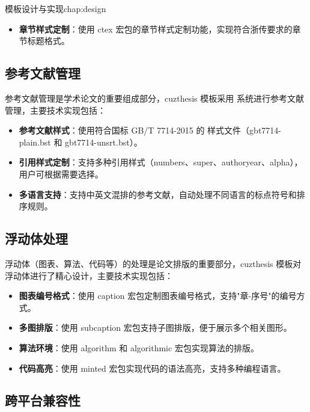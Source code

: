 \begin{cuzchapter}{模板设计与实现}{chap:design}
\begin{itemize}
        \item \textbf{章节样式定制}：使用 ctex 宏包的章节样式定制功能，实现符合浙传要求的章节标题格式。
    \end{itemize}

    \subsection{参考文献管理}

    参考文献管理是学术论文的重要组成部分，cuzthesis 模板采用  系统进行参考文献管理，主要技术实现包括：

    \begin{itemize}
        \item \textbf{参考文献样式}：使用符合国标 GB/T 7714-2015 的  样式文件（gbt7714-plain.bst 和 gbt7714-unsrt.bst）。

        \item \textbf{引用样式定制}：支持多种引用样式（numbers、super、authoryear、alpha），用户可根据需要选择。

        \item \textbf{多语言支持}：支持中英文混排的参考文献，自动处理不同语言的标点符号和排序规则。
    \end{itemize}

    \subsection{浮动体处理}

    浮动体（图表、算法、代码等）的处理是论文排版的重要部分，cuzthesis 模板对浮动体进行了精心设计，主要技术实现包括：

    \begin{itemize}
        \item \textbf{图表编号格式}：使用 caption 宏包定制图表编号格式，支持"章-序号"的编号方式。

        \item \textbf{多图排版}：使用 subcaption 宏包支持子图排版，便于展示多个相关图形。

        \item \textbf{算法环境}：使用 algorithm 和 algorithmic 宏包实现算法的排版。

        \item \textbf{代码高亮}：使用 minted 宏包实现代码的语法高亮，支持多种编程语言。
    \end{itemize}

    \subsection{跨平台兼容性}


\end{cuzchapter}
